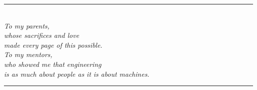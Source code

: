 
\thispagestyle{empty}

\vspace*{\fill}
\begin{center}
  \begin{minipage}{0.7\textwidth}
    \centering
    \textcolor{PrimaryBlue}{\rule{3cm}{0.5pt}}\\[1em]
    {\large\itshape
      To my parents,\\[6pt]
      whose sacrifices and love\\
      made every page of this possible.\\[1em]
      To my mentors,\\[6pt]
      who showed me that engineering\\
      is as much about people as it is about machines.
    }\\[1em]
    \textcolor{PrimaryBlue}{\rule{3cm}{0.5pt}}
  \end{minipage}
\end{center}
\vspace*{\fill}
